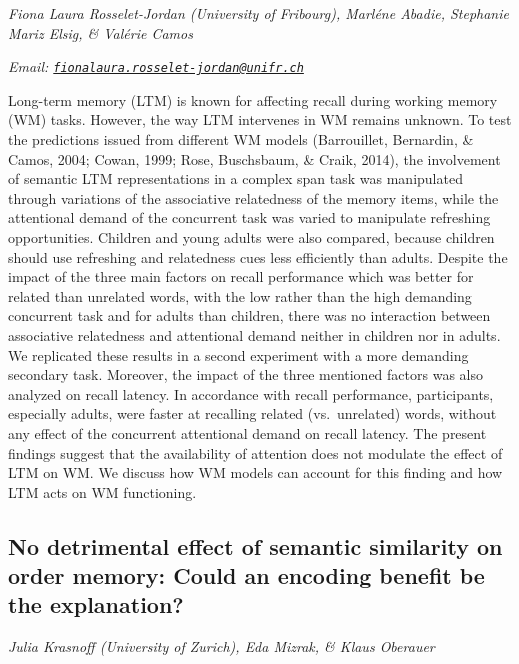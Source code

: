 \documentclass[
  12pt,
]{book}
\begin{document}
\emph{Fiona Laura Rosselet-Jordan (University of Fribourg), Marléne Abadie, Stephanie Mariz Elsig, \& Valérie Camos}

\emph{Email: \href{mailto:fionalaura.rosselet-jordan@unifr.ch}{\nolinkurl{fionalaura.rosselet-jordan@unifr.ch}}}

Long-term memory (LTM) is known for affecting recall during working memory (WM) tasks. However, the way LTM intervenes in WM remains unknown. To test the predictions issued from different WM models (Barrouillet, Bernardin, \& Camos, 2004; Cowan, 1999; Rose, Buschsbaum, \& Craik, 2014), the involvement of semantic LTM representations in a complex span task was manipulated through variations of the associative relatedness of the memory items, while the attentional demand of the concurrent task was varied to manipulate refreshing opportunities. Children and young adults were also compared, because children should use refreshing and relatedness cues less efficiently than adults. Despite the impact of the three main factors on recall performance which was better for related than unrelated words, with the low rather than the high demanding concurrent task and for adults than children, there was no interaction between associative relatedness and attentional demand neither in children nor in adults. We replicated these results in a second experiment with a more demanding secondary task. Moreover, the impact of the three mentioned factors was also analyzed on recall latency. In accordance with recall performance, participants, especially adults, were faster at recalling related (vs.~unrelated) words, without any effect of the concurrent attentional demand on recall latency. The present findings suggest that the availability of attention does not modulate the effect of LTM on WM. We discuss how WM models can account for this finding and how LTM acts on WM functioning.

\hypertarget{no-detrimental-effect-of-semantic-similarity-on-order-memory-could-an-encoding-benefit-be-the-explanation}{%
\subsection{No detrimental effect of semantic similarity on order memory: Could an encoding benefit be the explanation?}\label{no-detrimental-effect-of-semantic-similarity-on-order-memory-could-an-encoding-benefit-be-the-explanation}}

\emph{Julia Krasnoff (University of Zurich), Eda Mizrak, \& Klaus Oberauer}
\end{document}
